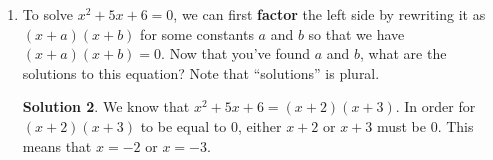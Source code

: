 \documentclass{article}
\theoremstyle{definition}
\newtheorem*{solution}{Solution}
\begin{document}
\begin{enumerate}
\begin{enumerate}
\begin{solution}
            \end{solution}
            \item To solve $x^2 + 5x + 6 = 0$, we can first \textbf{factor} the left side by rewriting it as $(x + a)(x + b)$ for some constants $a$ and $b$ so that we have $(x + a)(x + b) = 0$. Now that you've found $a$ and $b$, what are the solutions to this equation? Note that ``solutions'' is plural.
            \begin{solution}
                We know that $x^2 + 5x + 6 = (x + 2)(x + 3)$. In order for $(x + 2)(x + 3)$ to be equal to $0$, either $x + 2$ or $x + 3$ must be $0$. This means that $x = -2$ or $x = -3$.
            \end{solution}
        \end{enumerate}
    \end{enumerate}
\end{document}

